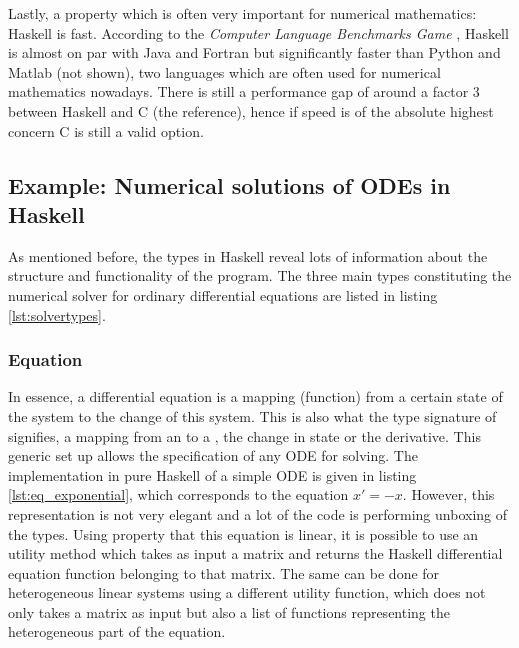 Lastly, a property which is often very important for numerical mathematics: Haskell is fast. According to the \textit{Computer Language Benchmarks Game} \cite{Bench}, Haskell is almost on par with Java and Fortran but significantly faster than Python and Matlab (not shown), two languages which are often used for numerical mathematics nowadays. There is still a performance gap of around a factor 3 between Haskell and C (the reference), hence if speed is of the absolute highest concern C is still a valid option.

\subsection{Example: Numerical solutions of ODEs in Haskell}
\label{s:numsolHaskell}
As mentioned before, the types in Haskell reveal lots of information about the structure and functionality of the program. The three main types constituting the numerical solver for ordinary differential equations are listed in listing \ref{lst:solvertypes}.



\subsubsection{Equation}
In essence, a differential equation is a mapping (function) from a certain state of the system to the change of this system. This is also what the type signature of  signifies, a mapping from an  to a , the change in state or the derivative. This generic set up allows the specification of any ODE for solving. The implementation in pure Haskell of a simple ODE is given in listing \ref{lst:eq_exponential}, which corresponds to the equation $x' = -x$. However, this representation is not very elegant and a lot of the code is performing unboxing of the types. Using property that this equation is linear, it is possible to use an utility method which takes as input a matrix and returns the Haskell differential equation function belonging to that matrix. The same can be done for heterogeneous linear systems using a different utility function, which does not only takes a matrix as input but also a list of functions representing the heterogeneous part of the equation.



